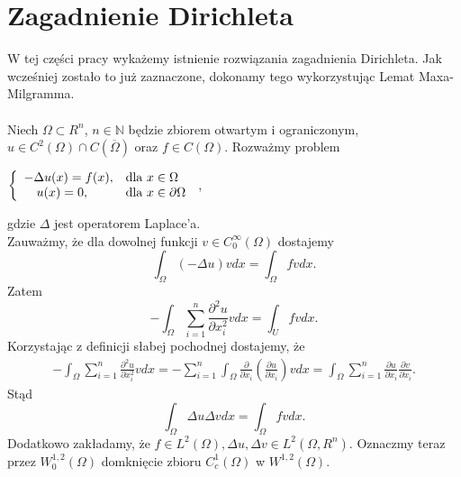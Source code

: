\documentclass[12pt,a4paper,oneside,titlepage]{article}
\begin{document}
\section{Zagadnienie Dirichleta}
W tej części pracy wykażemy istnienie rozwiązania zagadnienia Dirichleta. Jak wcześniej zostało to już zaznaczone, dokonamy tego wykorzystując Lemat Maxa-Milgramma. \\ \\
\indent
Niech $\Omega \subset R^{n}$, $n \in \mathbb{N}$ będzie zbiorem otwartym i ograniczonym, $u \in C^{2}(\Omega) \cap C(\overline{\Omega})$ oraz $f \in C(\Omega)$. 
Rozważmy problem
\begin{center}
\label{ProblemP}
$
 \left\{ \begin{array}{ll}
- \Delta u(x) = f(x), & \textrm{dla $ x \in \Omega$}\\
~~~u(x)=0, & \textrm{dla $ x \in \partial \Omega $} \\
\end{array} \right.
$ ,
\end{center}
gdzie $\Delta$ jest operatorem Laplace'a. \\
Zauważmy, że dla dowolnej funkcji $v \in C^{\infty}_0 (\Omega)$ dostajemy
\begin{equation}
\nonumber
\int_{\Omega} (-\Delta u ) v dx = \int_{\Omega} f v dx .
\end{equation}
Zatem
\begin{equation}
\nonumber
- \int_{\Omega} \sum_{i=1}^n \frac{\partial^2 u}{\partial x_i^2} v dx = \int_{U} f v dx .
\end{equation}
Korzystając z definicji słabej pochodnej dostajemy, że 
\begin{equation}
\nonumber
\begin{split}
- \int_{\Omega} \sum_{i=1}^n \frac{\partial^2 u}{\partial x_i^2} v dx = - \sum_{i=1}^n \int_{\Omega} \frac{\partial}{\partial x_i} \left( \frac{\partial u}{\partial x_i} \right) v dx = \int_{\Omega} \sum_{i=1}^n \frac{\partial u}{\partial x_i} \frac{\partial v}{\partial x _i}.
\end{split}
\end{equation}
Stąd
\begin{equation}
\nonumber
\int_{\Omega} \Delta u \Delta v dx = \int_{\Omega} f v dx.
\end{equation}
Dodatkowo zakładamy, że $f \in L^{2}(\Omega), \Delta u, \Delta v \in L^{2}(\Omega, R^n).$
Oznaczmy teraz przez $W^{1,2}_0(\Omega)$ domknięcie zbioru $C^1_c(\Omega) $ w $W^{1,2}(\Omega)$. \\
\end{document}
